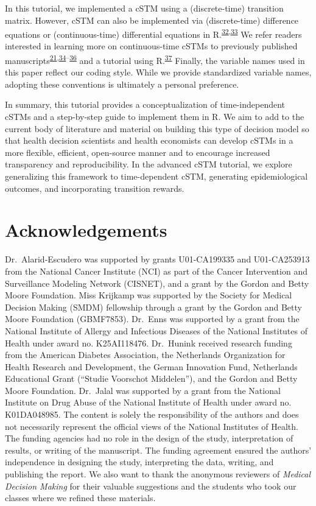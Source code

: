 \documentclass[
]{article}
\begin{document}
In this tutorial, we implemented a cSTM using a (discrete-time) transition matrix. However, cSTM can also be implemented via (discrete-time) difference equations or (continuous-time) differential equations in R.\textsuperscript{\protect\hyperlink{ref-Grimmett2014}{32},\protect\hyperlink{ref-Axler2005}{33}} We refer readers interested in learning more on continuous-time cSTMs to previously published manuscripts\textsuperscript{\protect\hyperlink{ref-VanRosmalen2013}{21},\protect\hyperlink{ref-Cao2016}{34}--\protect\hyperlink{ref-Soares2012}{36}} and a tutorial using R.\textsuperscript{\protect\hyperlink{ref-Frederix2013a}{37}} Finally, the variable names used in this paper reflect our coding style. While we provide standardized variable names, adopting these conventions is ultimately a personal preference.

In summary, this tutorial provides a conceptualization of time-independent cSTMs and a step-by-step guide to implement them in R. We aim to add to the current body of literature and material on building this type of decision model so that health decision scientists and health economists can develop cSTMs in a more flexible, efficient, open-source manner and to encourage increased transparency and reproducibility. In the advanced cSTM tutorial, we explore generalizing this framework to time-dependent cSTM, generating epidemiological outcomes, and incorporating transition rewards.

\hypertarget{acknowledgements}{%
\section{Acknowledgements}\label{acknowledgements}}

Dr.~Alarid-Escudero was supported by grants U01-CA199335 and U01-CA253913 from the National Cancer Institute (NCI) as part of the Cancer Intervention and Surveillance Modeling Network (CISNET), and a grant by the Gordon and Betty Moore Foundation. Miss Krijkamp was supported by the Society for Medical Decision Making (SMDM) fellowship through a grant by the Gordon and Betty Moore Foundation (GBMF7853). Dr.~Enns was supported by a grant from the National Institute of Allergy and Infectious Diseases of the National Institutes of Health under award no. K25AI118476. Dr.~Hunink received research funding from the American Diabetes Association, the Netherlands Organization for Health Research and Development, the German Innovation Fund, Netherlands Educational Grant (``Studie Voorschot Middelen''), and the Gordon and Betty Moore Foundation. Dr.~Jalal was supported by a grant from the National Institute on Drug Abuse of the National Institute of Health under award no. K01DA048985. The content is solely the responsibility of the authors and does not necessarily represent the official views of the National Institutes of Health. The funding agencies had no role in the design of the study, interpretation of results, or writing of the manuscript. The funding agreement ensured the authors' independence in designing the study, interpreting the data, writing, and publishing the report. We also want to thank the anonymous reviewers of \emph{Medical Decision Making} for their valuable suggestions and the students who took our classes where we refined these materials.
\end{document}
